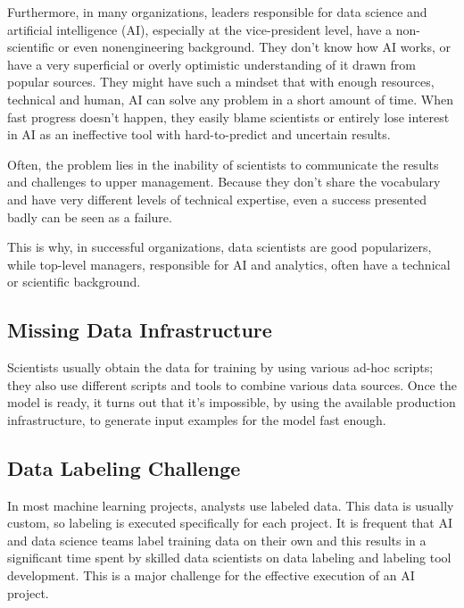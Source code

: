 Furthermore, in many organizations, leaders responsible for
data science and artificial intelligence (AI), especially at
the vice-president level, have a non-scientific or even
nonengineering background. They don't know how AI works,
or have a very superficial or overly optimistic understanding
of it drawn from popular sources. They might have such a mindset
that with enough resources, technical and human, AI can solve
any problem in a short amount of time. When fast progress doesn't
happen, they easily blame scientists or entirely lose interest
in AI as an ineffective tool with hard-to-predict and uncertain
results.

Often, the problem lies in the inability of scientists to
communicate the results and challenges to upper management.
Because they don't share the vocabulary and have very different
levels of technical expertise, even a success presented badly
can be seen as a failure.

This is why, in successful organizations, data scientists are
good popularizers, while top-level  managers, responsible for
AI and analytics, often have a technical or scientific background.



\subsection*{Missing Data Infrastructure}
Scientists usually obtain the data for training by using various
ad-hoc scripts; they also use different scripts and tools to combine
various data sources. Once the model is ready, it turns out that it's
impossible, by using the available production infrastructure,
to generate input examples for the model fast enough.



\subsection*{Data Labeling Challenge}
In most machine learning projects, analysts use labeled data.
This data is usually custom, so labeling is executed specifically
for each project. It is frequent that AI and data science teams
label training data on their own and this results in a significant
time spent by skilled data scientists on data labeling and labeling
tool development. This is a major challenge for the effective execution
of an AI project.




